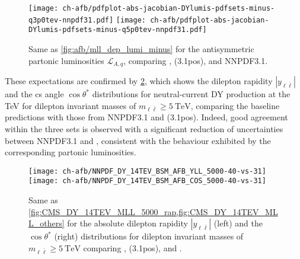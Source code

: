 \begin{figure}[!t]
 \centering
 \texttt{[image: ch-afb/pdfplot-abs-jacobian-DYlumis-pdfsets-minus-q3p0tev-nnpdf31.pdf]}
 \texttt{[image: ch-afb/pdfplot-abs-jacobian-DYlumis-pdfsets-minus-q5p0tev-nnpdf31.pdf]}
 \caption{Same as \cref{fig:afb/mll_dep_lumi_minus} for the antisymmetric partonic luminosities $\mathcal{L}_{A,q}$,
   comparing , (3.1pos), and NNPDF3.1.
 }    
 \label{fig:afb/pdfplot-absDYlumis-pdfsets-minus-q5tev-nnpdf31}
\end{figure}

These expectations are confirmed by
\cref{fig:afb/CMS_DY_14TEV_COSTH_5000_YLL40-vs-31}, which shows the
dilepton rapidity $|y_{\ell\bar{\ell}}|$ 
and the \acrlong{cs} angle $\cos\theta^*$ distributions for neutral-current DY production
at the  TeV for dilepton invariant masses of $m_{\ell\bar{\ell}}\ge \SI{5}{\tera\electronvolt}$,
comparing the baseline  predictions with those from NNPDF3.1
and (3.1pos).
%
Indeed, 
good agreement within the three \pdf sets is observed with a significant reduction
of \pdf uncertainties between NNPDF3.1 and , consistent
with the behaviour exhibited by the corresponding partonic luminosities.

\begin{figure}[!t]
 \centering
 \texttt{[image: ch-afb/NNPDF\_DY\_14TEV\_BSM\_AFB\_YLL\_5000-40-vs-31]}
 \texttt{[image: ch-afb/NNPDF\_DY\_14TEV\_BSM\_AFB\_COS\_5000-40-vs-31]}
 \caption{
   Same as \cref{fig:CMS_DY_14TEV_MLL_5000_rap,fig:CMS_DY_14TEV_MLL_others} for
   the absolute dilepton rapidity $|y_{\ell\bar{\ell}}|$ (left) and the $\cos
   \theta^*$ (right) distributions for dilepton invariant masses of
   $m_{\ell\bar{\ell}}\ge \SI{5}{\tera\electronvolt}$ comparing , (3.1pos),
   and .
 }    
 \label{fig:afb/CMS_DY_14TEV_COSTH_5000_YLL40-vs-31}
\end{figure}

